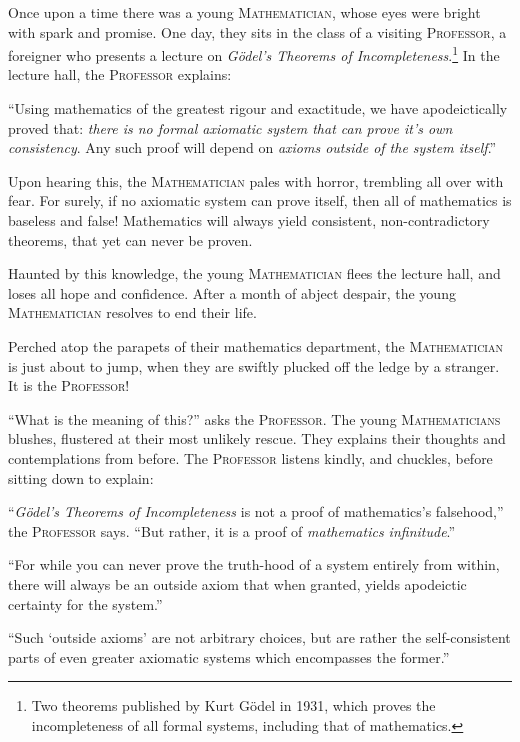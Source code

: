 \begin{displayquote}
  Once upon a time there was a young \textsc{Mathematician}, whose eyes were bright with spark and promise. One day, they sits in the class of a visiting \textsc{Professor}, a foreigner who presents a lecture on \emph{Gödel's Theorems of Incompleteness}.\footnote{Two theorems published by Kurt Gödel in 1931, which proves the incompleteness of all formal systems, including that of mathematics.} In the lecture hall, the \textsc{Professor} explains:

  \enquote{Using mathematics of the greatest rigour and exactitude, we have apodeictically proved that: \emph{there is no formal axiomatic system that can prove it's own consistency}. Any such proof will depend on \emph{axioms outside of the system itself}.}

  Upon hearing this, the \textsc{Mathematician} pales with horror, trembling all over with fear. For surely, if no axiomatic system can prove itself, then all of mathematics is baseless and false! Mathematics will always yield consistent, non-contradictory theorems, that yet can never be proven.

  Haunted by this knowledge, the young \textsc{Mathematician} flees the lecture hall, and loses all hope and confidence. After a month of abject despair, the young \textsc{Mathematician} resolves to end their life.

  Perched atop the parapets of their mathematics department, the \textsc{Mathematician} is just about to jump, when they are swiftly plucked off the ledge by a stranger. It is the \textsc{Professor}!

  \enquote{What is the meaning of this?} asks the \textsc{Professor}. The young \textsc{Mathematicians} blushes, flustered at their most unlikely rescue. They explains their thoughts and contemplations from before. The \textsc{Professor} listens kindly, and chuckles, before sitting down to explain:

  \enquote{\emph{Gödel's Theorems of Incompleteness} is not a proof of mathematics's falsehood,} the \textsc{Professor} says. \enquote{But rather, it is a proof of \emph{mathematics infinitude}.}

  \enquote{For while you can never prove the truth-hood of a system entirely from within, there will always be an outside axiom that when granted, yields apodeictic certainty for the system.}

  \enquote{Such \enquote*{outside axioms} are not arbitrary choices, but are rather the self-consistent parts of even greater axiomatic systems which encompasses the former.}


\end{displayquote}
